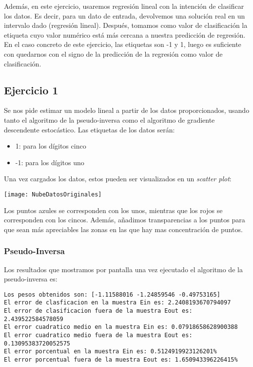 \documentclass[11pt]{article}
\begin{document}
Además, en este ejercicio, usaremos regresión lineal con la intención de clasificar los datos. Es decir, para un dato de entrada, devolvemos una solución real en un intervalo dado (regresión lineal). Después, tomamos como valor de clasificación la etiqueta cuyo valor numérico está más cercana a nuestra predicción de regresión. En el caso concreto de este ejercicio, las etiquetas son -1 y 1, luego es suficiente con quedarnos con el signo de la predicción de la regresión como valor de clasificación.

\subsection{Ejercicio 1}

Se nos pide estimar un modelo lineal a partir de los datos proporcionados, usando tanto el algoritmo de la pseudo-inversa como el algoritmo de gradiente descendente estocástico. Las etiquetas de los datos serán:

\begin{itemize}
    \item 1: para los dígitos cinco
    \item -1: para los dígitos uno
\end{itemize}

Una vez cargados los datos, estos pueden ser visualizados en un \emph{scatter plot}:

\begin{center}
\texttt{[image: NubeDatosOriginales]}
\end{center}

Los puntos azules se corresponden con los unos, mientras que los rojos se corresponden con los cincos. Además, añadimos transparencias a los puntos para que sean más apreciables las zonas en las que hay mas concentración de puntos.

\subsubsection{Pseudo-Inversa}

Los resultados que mostramos por pantalla una vez ejecutado el algoritmo de la pseudo-inversa es:

\begin{lstlisting}
Los pesos obtenidos son: [-1.11588016 -1.24859546 -0.49753165]
El error de clasficacion en la muestra Ein es: 2.2408193670794097
El error de clasificacion fuera de la muestra Eout es: 2.439522584578059
El error cuadratico medio en la muestra Ein es: 0.07918658628900388
El error cuadratico medio fuera de la muestra Eout es: 0.13095383720052575
El error porcentual en la muestra Ein es: 0.5124919923126201%
El error porcentual fuera de la muestra Eout es: 1.650943396226415%
\end{lstlisting}
\end{document}
